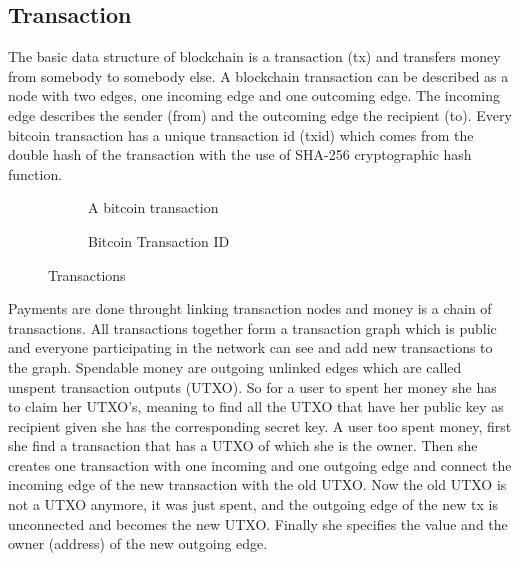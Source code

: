 \subsection{Transaction}\label{blockchain:structure:tx}

The basic data structure of blockchain is a transaction (tx) and transfers money from somebody to somebody else. A blockchain transaction can be described as
a node with two edges, one incoming edge and one outcoming edge. The incoming edge describes the sender (from) and the outcoming edge the recipient (to).
Every bitcoin transaction has a unique transaction id (txid) which comes from the double hash of the transaction with the use of SHA-256 cryptographic hash function.

\begin{figure}[h]
  \begin{subfigure}[t]{0.50\textwidth}
    \centering
    \caption{A bitcoin transaction}
    \label{fig:bl_tx:tx}
  \end{subfigure}
  \begin{subfigure}[t]{0.50\textwidth}
    \centering
    \caption{Bitcoin Transaction ID}
    \label{fig:bl_tx:id}
  \end{subfigure}
  \caption{Transactions}
  \label{fig:bl_transaction}
\end{figure}

Payments are done throught linking transaction nodes and money is a chain of transactions. All transactions together form a transaction graph which is public and everyone participating in
the network can see and add new transactions to the graph. Spendable money are outgoing unlinked edges which are called unspent transaction outputs (UTXO). So for a user to spent her money
she has to claim her UTXO's, meaning to find all the UTXO that have her public key as recipient given she has the corresponding secret key. A user too spent money, first she find a transaction
that has a UTXO of which she is the owner. Then she creates one transaction with one incoming and one outgoing edge and connect the incoming edge of the new transaction with the old UTXO.
Now the old UTXO is not a UTXO anymore, it was just spent, and the outgoing edge of the new tx is unconnected and becomes the new UTXO. Finally she specifies the value and the owner (address)
of the new outgoing edge.


